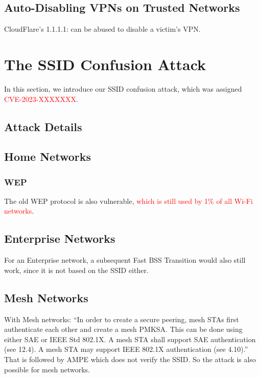 \documentclass[sigconf,review]{acmart}
\newcommand{\wifi}{\mbox{Wi-Fi}}
\DeclareRobustCommand{\red}[1]{\textcolor{red}{#1}}
\begin{document}
\subsection{Auto-Disabling VPNs on Trusted Networks}

CloudFlare's 1.1.1.1: can be abused to disable a victim's VPN.

\section{The SSID Confusion Attack}
\label{sec:attack}

In this section, we introduce our SSID confusion attack, which was assigned \red{CVE-2023-XXXXXXX}.

\subsection{Attack Details}



\subsection{Home Networks}

\subsubsection{WEP}
The old WEP protocol is also vulnerable, \red{which is still used by 1\% of all \wifi{} networks}.

\subsection{Enterprise Networks} %

For an Enterprise network, a subsequent Fast BSS Transition would also still work, since it is not based on the SSID either.

\subsection{Mesh Networks}

With Mesh networks: ``In order to create a secure peering, mesh STAs first authenticate each other and create a mesh PMKSA. This can be done using either SAE or IEEE Std 802.1X. A mesh STA shall support SAE authentication (see 12.4). A mesh STA may support IEEE 802.1X authentication (see 4.10).''
That is followed by AMPE which does not verify the SSID.
So the attack is also possible for mesh networks.
\end{document}
